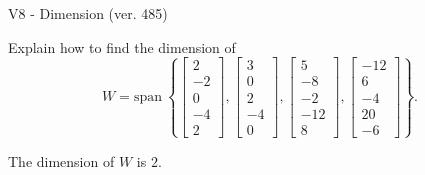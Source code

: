 \begin{exercise}
  \begin{exerciseTitle}V8 - Dimension (ver. 485)\end{exerciseTitle}
  \begin{exerciseStatement}
    Explain how to find the dimension of 
\[W=\mathrm{span}\ \left\{\left[\begin{array}{r}
2 \\
-2 \\
0 \\
-4 \\
2
\end{array}\right] , \left[\begin{array}{r}
3 \\
0 \\
2 \\
-4 \\
0
\end{array}\right] , \left[\begin{array}{r}
5 \\
-8 \\
-2 \\
-12 \\
8
\end{array}\right] , \left[\begin{array}{r}
-12 \\
6 \\
-4 \\
20 \\
-6
\end{array}\right]\right\}.\]



  \end{exerciseStatement}
  \begin{exerciseAnswer}
   The dimension of \(W\) is  \(2\).
  


  \end{exerciseAnswer}
\end{exercise}